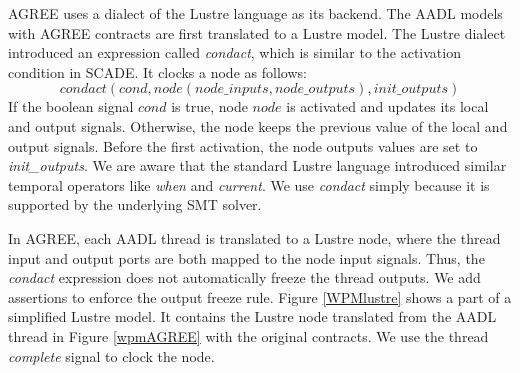 
AGREE uses a dialect \cite{GAO2008111} of the Lustre language as its backend. The AADL models with AGREE contracts are first translated to a Lustre model. The Lustre dialect introduced an expression called \emph{condact}, which is similar to the activation condition in SCADE.
It clocks a node as follows: 
\begin{equation*}
condact (cond, node(node\_inputs, node\_outputs), init\_outputs)
\end{equation*}
If the boolean signal $cond$ is true, node $node$ is activated and updates its local and output signals. Otherwise, the node keeps the previous value of the local and output signals. Before the first activation, the node outputs values are set to \emph{init\_outputs}. %
We are aware that the standard Lustre language introduced similar temporal operators like \emph{when} and \emph{current}. We use \emph{condact} simply because it is supported by the underlying SMT solver.

In AGREE, each AADL thread is translated to a Lustre node, where the thread input and output ports are both mapped to the node input signals. Thus, the \emph{condact} expression does not automatically freeze the thread outputs. We add assertions to enforce the output freeze rule. Figure \ref{WPMlustre} shows a part of a simplified Lustre model. It contains the Lustre node translated from the AADL thread in Figure \ref{wpmAGREE} with the original contracts. We use the thread \emph{complete} signal to clock the node.

